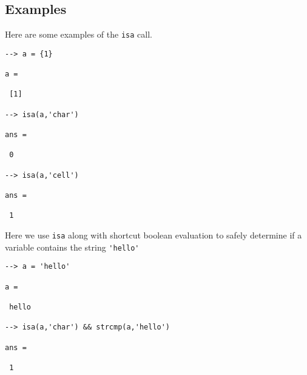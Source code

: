 \subsection{Examples}

Here are some examples of the \verb|isa| call.
\begin{verbatim}
--> a = {1}

a = 

 [1] 

--> isa(a,'char')

ans = 

 0 

--> isa(a,'cell')

ans = 

 1 
\end{verbatim}
Here we use \verb|isa| along with shortcut boolean evaluation to 
safely determine if a variable contains the string \verb|'hello'|
\begin{verbatim}
--> a = 'hello'

a = 

 hello

--> isa(a,'char') && strcmp(a,'hello')

ans = 

 1 
\end{verbatim}
